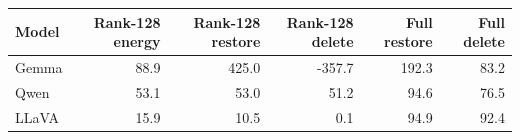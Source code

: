 \begin{samepage}
\begin{center}
\begin{minipage}{\linewidth}
\captionsetup{type=table,hypcap=false}
\caption{\textbf{An example-shared 128-dimensional subspace fails bidirectional effect matching at the initial interfaces.} Gemma/Qwen use visual positions and LLaVA uses answer-adjacent positions, each at its initially selected layer. Values are percentages of the mean clean-minus-masked sequence-score change on the separate 40-example replication set. Energy is the squared hidden-difference norm retained by the projection. Values above 100 indicate effect overshoot, and negative values indicate effect reversal. Rank 128 is the largest tested subspace; no rank from 1 to 128 passes both restoration and corrupted-state-replacement selection gates in any model. Full columns report the unprojected hidden-state reference at the same layer and positions.}
\label{tab:shared-subspace-summary}
\centering
\normalsize
\setlength{\tabcolsep}{2.8pt}
\begin{tabular*}{\linewidth}{@{\extracolsep{\fill}}lrrrrr@{}}
\toprule
Model & Rank-128 energy & Rank-128 restore & Rank-128 delete & Full restore & Full delete \\
\midrule
Gemma & 88.9 & 425.0 & -357.7 & 192.3 & 83.2 \\
Qwen & 53.1 & 53.0 & 51.2 & 94.6 & 76.5 \\
LLaVA & 15.9 & 10.5 & 0.1 & 94.9 & 92.4 \\
\bottomrule
\end{tabular*}
\end{minipage}
\end{center}
\end{samepage}

